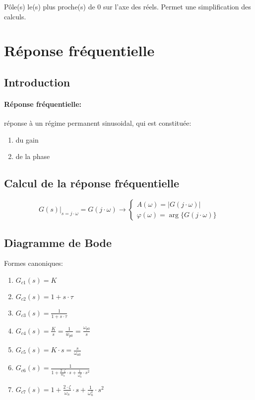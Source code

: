 \documentclass[10pt, twocolumn]{article}
\begin{document}
			Pôle(s) le(s) plus proche(s) de 0 sur l'axe des réels. Permet une simplification des calculs.
			
	\section*{Réponse fréquentielle}
		
		\subsection{Introduction}
		
			\paragraph{Réponse fréquentielle:} réponse à un régime permanent sinusoidal, qui est constituée:
			\begin{enumerate}
				\item du gain 
				\item de la phase
			\end{enumerate}
		
		\subsection{Calcul de la réponse fréquentielle}
		
			\[
			\left.G(s)\right|_{s=j \cdot \omega}=G(j \cdot \omega) \longrightarrow\left\{\begin{array}{l}
			A(\omega)=|G(j \cdot \omega)| \\
			\varphi(\omega)=\arg \{G(j \cdot \omega)\}
			\end{array}\right.
			\]
		
		\subsection{Diagramme de Bode}
		
			Formes canoniques:
			
			\begin{enumerate}
				\item $G_{c 1}(s)=K$
				\item $G_{c 2}(s)=1+s \cdot \tau$
				\item $G_{c 3}(s)=\frac{1}{1+s \cdot \tau}$
				\item $G_{c 4}(s)=\frac{K}{s}=\frac{1}{\bar{w}_{p 0}}=\frac{\omega_{p 0}}{s}$
				\item $G_{c 5}(s)=K \cdot s=\frac{s}{\omega_{a 0}}$
				\item $G_{c 6}(s)=\frac{1}{1+\frac{2 \cdot \zeta}{w_{n}} \cdot s+\frac{1}{\omega_{n}^{2}} \cdot s^{2}}$
				\item $G_{c 7}(s)=1+\frac{2 \cdot \zeta}{\omega_{n}} \cdot s+\frac{1}{\omega_{n}^{2}} \cdot s^{2}$
			\end{enumerate}
			
\end{document}
